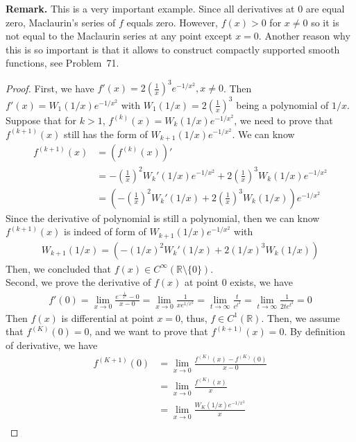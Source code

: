 \documentclass[12pt,leqno]{amsart}
\theoremstyle{definition}
\begin{document}
\noindent
{\bf Remark.}
This is a very important example. Since all derivatives at $0$ are equal zero, Maclaurin's series of $f$ equals zero. However, $f(x)>0$ for $x\neq 0$ so it is not equal to the Maclaurin series at any point except $x=0$. Another reason why this is so important is that it allows to construct compactly supported smooth functions, see Problem~71.
\begin{proof}
First, we have $f'(x) = 2\left(\frac{1}{x}\right)^3 e^{-1/x^2}, x \neq 0$. Then $f'(x) = W_1(1/x)e^{-1/x^2}$ with $W_1(1/x) = 2\left(\frac{1}{x}\right)^3$ being a polynomial of $1/x$. Suppose that for $k>1$, $f^{(k)}(x) = W_k(1/x) e^{-1/x^2}$, we need to prove that $f^{(k+1)}(x)$ still has the form of $W_{k+1}(1/x)e^{-1/x^2}$. We can know 
\begin{align*}
    f^{(k+1)}(x) & = (f^{(k)}(x))' \\
    & = -\left(\frac{1}{x}\right)^2 W_k'(1/x)e^{-1/x^2} + 2\left(\frac{1}{x}\right)^3 W_k(1/x) e^{-1/x^2} \\
    & = \left(-\left(\frac{1}{x}\right)^2 W_k'(1/x) + 2\left(\frac{1}{x}\right)^3 W_k(1/x) \right)e^{-1/x^2} 
\end{align*}
Since the derivative of polynomial is still a polynomial, then we can know $f^{(k+1)}(x)$ is indeed of form of $W_{k+1}(1/x)e^{-1/x^2}$ with
\begin{align*}
    W_{k+1}(1/x) = \left(-\left(1/x\right)^2 W_k'(1/x) + 2\left(1/x\right)^3 W_k(1/x) \right)
\end{align*}
Then, we concluded that $f(x)\in C^\infty(\mathbb{R}\setminus \{0\})$.\\
\hspace*{3em}Second, we prove the derivative of $f(x)$ at point $0$ exists, we have 
\begin{align*}
    f'(0)=\lim_{x\rightarrow 0}\frac{e^{-\frac{1}{x^2}}-0}{x-0} = \lim_{x\rightarrow 0}\frac{1}{x e^{1/x^2}} = \lim_{t\to\infty}\frac{t}{e^{t^2}} = \lim_{t\to\infty}\frac{1}{2te^{t^2}} = 0
\end{align*}
Then $f(x)$ is differential at point $x=0$, thus, $f\in C^1(\mathbb{R})$. Then, we assume that $f^{(K)}(0) = 0$, and we want to prove that $f^{(k+1)}(x) = 0$. By definition of derivative, we have 
\begin{align*}
    f^{(K+1)}(0) & = \lim_{x\to 0}\frac{f^{(K)}(x) - f^{(K)}(0)}{x - 0}\\
    & = \lim_{x\to 0}\frac{f^{(K)}(x)}{x} \\
    & = \lim_{x\to 0}\frac{W_K(1/x)e^{-1/x^2}}{x} \\

\end{align*}
\end{proof}
\end{document}
